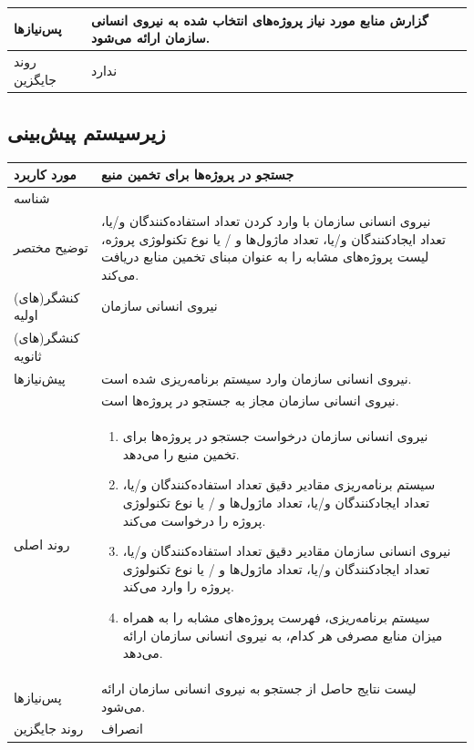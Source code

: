 \begin{table}[H]
\begin{tabular}{|p{3cm}|p{10cm}|}
		پس‌نیازها &
		گزارش منابع مورد نیاز پروژه‌های انتخاب شده به نیروی انسانی سازمان ارائه می‌شود. \\
		\hline
		
		روند جایگزین
		& ندارد \\
		\hline
		
	\end{tabular}
\end{table}

\subsection{زیرسیستم پیش‌بینی}

\begin{table}[H]
	\centering
	\begin{tabular}{|p{3cm}|p{10cm}|}
		\hline
		مورد کاربرد & جستجو در پروژه‌ها برای تخمین منبع  \\
		\hline
		شناسه & 
		\stepcounter{usecase_ID}
		\arabic{usecase_ID} \\
		\hline
		توضیح مختصر & نیروی انسانی سازمان با وارد کردن تعداد استفاده‌کنندگان و/یا، تعداد ایجادکنندگان و/یا، تعداد ماژول‌ها و / یا نوع تکنولوژی پروژه، لیست پروژه‌های مشابه را به عنوان مبنای تخمین منابع دریافت می‌کند. \\
		\hline
		کنشگر(های) اولیه & نیروی انسانی سازمان \\
		\hline
		کنشگر(های) ثانویه &  \\
		\hline
		پیش‌نیازها & نیروی انسانی سازمان وارد سیستم برنامه‌ریزی شده است. \\
		& نیروی انسانی سازمان مجاز به جستجو در پروژه‌ها است. \\
		\hline
		
		
		روند اصلی &
		\begin{enumerate}[topsep=0cm,leftmargin=0.5cm]
			\item نیروی انسانی سازمان درخواست جستجو در پروژه‌ها برای تخمین منبع را می‌دهد.
			\item سیستم برنامه‌ریزی مقادیر  دقیق تعداد استفاده‌کنندگان و/یا، تعداد ایجادکنندگان و/یا، تعداد ماژول‌ها و / یا نوع تکنولوژی پروژه را درخواست می‌کند.
			\item نیروی انسانی سازمان مقادیر دقیق تعداد استفاده‌کنندگان و/یا، تعداد ایجادکنندگان و/یا، تعداد ماژول‌ها و / یا نوع تکنولوژی پروژه را وارد می‌کند. 
			\item سیستم برنامه‌ریزی، فهرست پروژه‌های مشابه را به همراه میزان منابع مصرفی هر کدام، به نیروی انسانی سازمان ارائه می‌دهد. 
		\end{enumerate} \\
		
		\hline
		
		
		پس‌نیازها & لیست نتایج حاصل از جستجو به نیروی انسانی سازمان ارائه می‌شود. \\
		\hline
		
		
		روند جایگزین & انصراف \\
		\hline
	\end{tabular}
\end{table}


